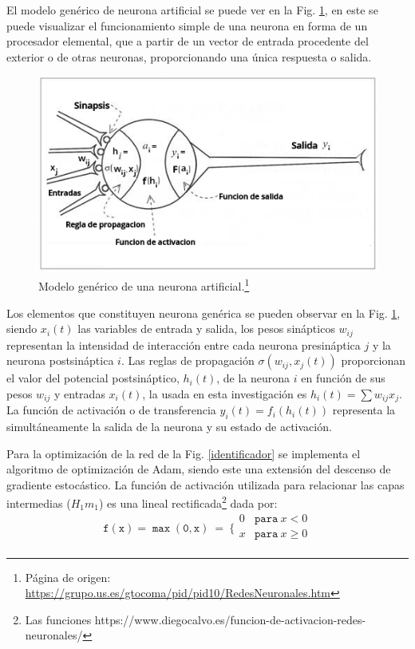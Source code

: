 El modelo genérico de neurona artificial se puede ver en la Fig. \ref{generico}, en este se puede visualizar el funcionamiento simple de una neurona en forma de un procesador elemental, que a partir de un vector de entrada procedente del exterior o de otras neuronas, proporcionando una única respuesta o salida.

\begin{figure}[!h]
\centering
\includegraphics[width=.7\textwidth]{Simulacion/imagenes/generico.png}
\caption[Modelo genérico de una neurona artificial.]{Modelo genérico de una neurona artificial.\footnote{Página de origen: \href{https://grupo.us.es/gtocoma/pid/pid10/RedesNeuronales.htm}{https://\-gru\-po.\-us.\-es/\-gto\-coma/\-pid/\-pid10/\-Re\-des\-Neu\-ro\-na\-les.\-htm}}}
\label{generico}
\end{figure}

Los elementos que constituyen neurona genérica se pueden observar en la Fig. \ref{generico}, siendo $x_i(t)$ las variables de entrada y salida, los pesos sinápticos $w_{ij}$ representan la intensidad de interacción entre cada neurona presináptica $j$ y la neurona postsináptica $i$. Las reglas de propagación $\sigma(w_{ij}, x_j(t))$ proporcionan el valor del potencial postsináptico, $h_i(t)$, de la neurona $i$ en función de sus pesos $w_{ij}$ y entradas $x_i(t)$, la usada en esta investigación es $h_i (t) = \sum w_{ij} x_j$. La función de activación o de transferencia $y_i(t) = f_i(h_i(t))$ representa la simultáneamente la salida de la neurona y su estado de activación. 

Para la optimización de la red de la Fig. \ref{identificador} se implementa el algoritmo de optimización de Adam, siendo este una extensión del descenso de gradiente estocástico. La función de activación utilizada para relacionar las capas intermedias ($H_1m_1$) es una lineal rectificada\footnote{Las funciones https://www.diegocalvo.es/funcion-de-activacion-redes-neuronales/} dada por:
\begin{equation}
\mathtt{f(x)=\max (0,x)} ~ = ~ \Bigg\{\begin{matrix}
0 & \mathtt{para }~ x<0\\
x & \mathtt{para }~ x\geq 0\\
\end{matrix} 
\end{equation}

